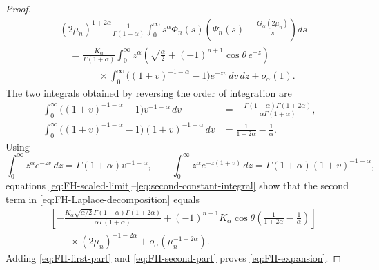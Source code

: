 \documentclass[11pt]{amsart}
\numberwithin{equation}{section}
\theoremstyle{remark}
\begin{document}
\begin{proof}
\begin{equation}\label{eq:FH-scaled-limit}
 \begin{aligned}
 &(2\mu_n)^{1+2\alpha}
 \frac1{\Gamma(1+\alpha)}\int_0^\infty
 s^\alpha\Phi_n(s)
 \left(\Psi_n(s)-\frac{G_\alpha(2\mu_n)}s\right)ds\\
 &\quad=\frac{K_\alpha}{\Gamma(1+\alpha)}
 \int_0^\infty z^\alpha
 \left(\sqrt{\frac\alpha2}
 +(-1)^{n+1}\cos\theta\,e^{-z}\right)\\
 &\qquad\qquad\times\int_0^\infty
 \bigl((1+v)^{-1-\alpha}-1\bigr)e^{-zv}\,dv\,dz
 +o_\alpha(1).
 \end{aligned}
\end{equation}
The two integrals obtained by reversing the order of integration are
\begin{align}
 \int_0^\infty\bigl((1+v)^{-1-\alpha}-1\bigr)v^{-1-\alpha}\,dv
 &=-\frac{\Gamma(1-\alpha)\Gamma(1+2\alpha)}
 {\alpha\Gamma(1+\alpha)},
 \label{eq:first-constant-integral}\\
 \int_0^\infty\bigl((1+v)^{-1-\alpha}-1\bigr)
 (1+v)^{-1-\alpha}\,dv
 &=\frac1{1+2\alpha}-\frac1\alpha.
 \label{eq:second-constant-integral}
\end{align}
Using
\[
 \int_0^\infty z^\alpha e^{-zv}\,dz
 =\Gamma(1+\alpha)v^{-1-\alpha},
 \qquad
 \int_0^\infty z^\alpha e^{-z(1+v)}\,dz
 =\Gamma(1+\alpha)(1+v)^{-1-\alpha},
\]
equations \eqref{eq:FH-scaled-limit}--\eqref{eq:second-constant-integral}
show that the second term in \eqref{eq:FH-Laplace-decomposition} equals
\begin{equation}\label{eq:FH-second-part}
 \begin{aligned}
 &\left[-\frac{K_\alpha\sqrt{\alpha/2}\,
 \Gamma(1-\alpha)\Gamma(1+2\alpha)}
 {\alpha\Gamma(1+\alpha)}
 +(-1)^{n+1}K_\alpha\cos\theta
 \left(\frac1{1+2\alpha}-\frac1\alpha\right)\right]\\
 &\qquad\times(2\mu_n)^{-1-2\alpha}
 +o_\alpha(\mu_n^{-1-2\alpha}).
 \end{aligned}
\end{equation}
Adding \eqref{eq:FH-first-part} and \eqref{eq:FH-second-part} proves
\eqref{eq:FH-expansion}.


\end{proof}
\end{document}
